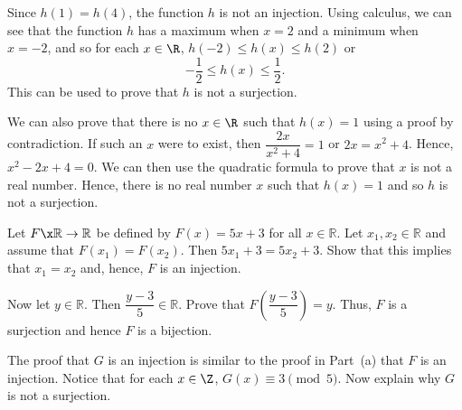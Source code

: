 \begin{list}{}
\item \begin{list}{\bf{(h)}}
\item Since $h(1) = h(4)$, the function $h$ is not an injection.  Using calculus, we can see that the function $h$ has a maximum when $x = 2$ and a minimum when $x = -2$, and so for each $x \in \R$, $h(-2) \leq h(x) \leq h(2)$ or
\[
-\frac{1}{2} \leq h(x) \leq \frac{1}{2}.
\]
This can be used to prove that $h$ is not a surjection.  

We can also prove that there is no $x \in \R$ such that $h(x) = 1$ using a proof by contradiction.  If such an $x$ were to exist, then $\dfrac{2x}{x^2 + 4} = 1$ or $2x = x^2 + 4$.  Hence, $x^2 - 2x + 4 = 0$.  We can then use the quadratic formula to prove that $x$ is not a real number.  Hence, there is no real number $x$ such that $h(x) = 1$ and so $h$ is not a surjection.
\end{list}
\end{list}



\begin{list}{\bf{\ref{exer:forexample}.}}
\item \begin{list}{\bf{(a)}}
\item Let $F\x \mathbb{R} \to \mathbb{R}$ be defined by $F( x ) = 5x + 3$ for all 
$x \in \mathbb{R}$.  Let  $x_1, x_2 \in \mathbb{R}$ and assume that 
$F( x_1 ) = F( x_2 )$.  Then  $5x_1 + 3 = 5x_2 + 3$.  Show that this implies that $x_1 = x_2$ and, hence, $F$ is an injection.  

Now let $y \in \mathbb{R}$.  Then $\dfrac{y - 3}{5} \in \mathbb{R}$.  Prove that 
$F \!\left( \dfrac{y - 3}{5} \right) = y$.   Thus, $F$ is a surjection and hence $F$ is a bijection.
\end{list}
\end{list}

\begin{list}{}
\item \begin{list}{\bf{(b)}}
\item The proof that $G$ is an injection is similar to the proof in Part~(a) that $F$ is an injection.  Notice that for each $x \in \Z$, $G(x) \equiv 3 \pmod 5$.  Now explain why $G$ is not a surjection.
\end{list}
\end{list}



